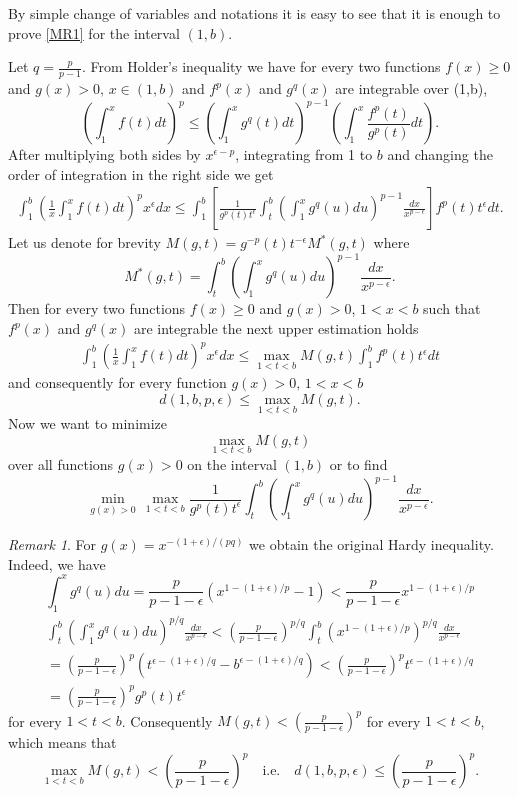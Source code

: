 \documentclass{amsart}
\theoremstyle{definition}
\theoremstyle{remark}
\newtheorem{remark}[theorem]{Remark}
\numberwithin{equation}{section}
\begin{document}
By simple change of variables and notations it is easy to see that it is enough to prove \eqref{MR1} for the interval $(1,b)$.

Let $q=\frac{p}{p-1}$. From Holder's inequality we have for every two  functions $f(x)\geq0$ and $g(x)> 0, \,x\in(1,b)$ and $f^p(x)$
 and $g^q(x)$ are integrable over (1,b), 
\[
\left(\int_1^x f(t)dt \right)^p   \le\left(\int_1^x g^q(t)dt  \right)^{p-1}\left(\int_1^x \frac{f^p(t)}{g^p(t)}dt  \right).
\]
After multiplying both sides by $x^{\epsilon-p}$, integrating from 1 to $b$ and changing the order of integration in the right side 
we get
\begin{align*}
\int_1^b\left(\frac{1}{x}\int_1^x f(t)dt \right)^p x^\epsilon dx   \le 
\int_1^b\left[\frac{1}{g^p(t)t^\epsilon}\int_t^b\left(\int_1^x g^q(u)du \right)^{p-1}\frac{dx}{x^{p-\epsilon}}  \right]f^p(t)t^\epsilon dt.
\end{align*}
Let us denote for brevity $M(g,t)=g^{-p}(t)t^{-\epsilon}M^*(g,t)$ where
\[
M^*(g,t)=\int_t^b\left(\int_1^x g^q(u)du \right)^{p-1}\frac{dx}{x^{p-\epsilon}}.
\]
Then for every two functions $f(x)\geq 0$ and $g(x)> 0$, $1<x<b$ such that $f^p(x)$ and $g^q(x)$ are integrable the next upper estimation holds
\begin{align*}
\int_1^b\left(\frac{1}{x}\int_1^x f(t)dt \right)^px^\epsilon dx   \le 
\max_{1< t< b}M(g,t)  \int_1^b f^p(t) t^\epsilon dt
\end{align*}
and consequently for every function $g(x)> 0,\,1<x<b$
\[
d(1,b,p,\epsilon)\le \max_{1< t< b}M(g,t). 
\]
Now we want to minimize 
\[
\max_{1< t< b}M(g,t)
\]
 over all functions  $g(x)> 0$ on the interval $(1,b)$ or to find 
\[
\min_{g(x)> 0}\,\max_{1< t< b}\frac{1}{g^p(t)t^\epsilon}\int_t^b\left(\int_1^x g^q(u)du \right)^{p-1}\frac{dx}{x^{p-\epsilon}}.
\]
\begin{remark}
For $g(x)=x^{-(1+\epsilon)/(pq)}$ we obtain the original Hardy inequality. Indeed, we have
\[
\int_1^x g^q(u)du=\frac{p}{p-1-\epsilon}  \left(x^{1-(1+\epsilon)/p}-1\right)<\frac{p}{p-1-\epsilon}x^{1-(1+\epsilon)/p}
\]
\begin{align*}
\int_t^b\left(\int_1^x g^q(u)du \right)^{p/q}\frac{dx}{x^{p-\epsilon}}
<\left(\frac{p}{p-1-\epsilon}\right)^{p/q}
\int_t^b \left(x^{1-(1+\epsilon)/p} \right)^{p/q}\frac{dx}{x^{p-\epsilon}}\\
=\left(\frac{p}{p-1-\epsilon}\right)^{p}\left(t^{\epsilon-(1+\epsilon)/q}-b^{\epsilon-(1+\epsilon)/q} \right)
<\left(\frac{p}{p-1-\epsilon}\right)^{p}t^{\epsilon-(1+\epsilon)/q}\\
=\left(\frac{p}{p-1-\epsilon}\right)^{p} g^p(t)t^{\epsilon}
 \end{align*}
for every $1< t< b$. Consequently $M(g,t)<\left(\frac{p}{p-1-\epsilon}\right)^{p}$ for every $1< t< b$, which means that
\[
\max_{1< t< b}M(g,t)<\left(\frac{p}{p-1-\epsilon}\right)^{p} \quad\mbox{i.e.}\quad d(1,b,p,\epsilon)\le \left(\frac{p}{p-1-\epsilon}\right)^{p} .
\]
\end{remark}
\end{document}
